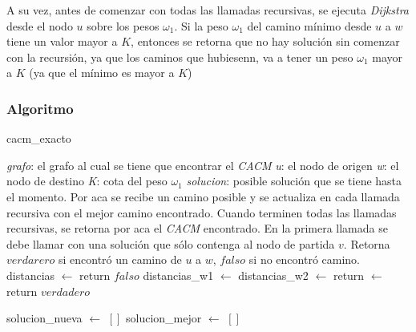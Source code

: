 A su vez, antes de comenzar con todas las llamadas recursivas, se ejecuta \emph{Dijkstra} desde el nodo $u$ sobre los pesos $\omega_1$. Si la peso $\omega_1$ del camino m\'inimo desde $u$ a $w$ tiene un valor mayor a $K$, entonces se retorna que no hay soluci\'on sin comenzar con la recursi\'on, ya que los caminos que hubiesenn, va a tener un peso $\omega_1$ mayor a $K$ (ya que el m\'inimo es mayor a $K$)

\subsubsection{Algoritmo}

\begin{algorithm}[!h]
\caption{cacm\_exacto} \label{exacto:pseudo}
\end{algorithm}
\begin{algorithmic}[1]
	\Require \emph{grafo}: el grafo al cual se tiene que encontrar el \emph{CACM}
	\Require \emph{u}: el nodo de origen
	\Require \emph{w}: el nodo de destino
	\Require \emph{K}: cota del peso $\omega_1$
	\Require \emph{solucion}: posible soluci\'on que se tiene hasta el momento. Por aca se recibe un camino posible y se actualiza en cada llamada recursiva con el mejor camino encontrado. Cuando terminen todas las llamadas recursivas, se retorna por aca el \emph{CACM} encontrado. En la primera llamada se debe llamar con una soluci\'on que s\'olo contenga al nodo de partida $v$.
	\Statex
	\Ensure Retorna $verdarero$ si encontr\'o un camino de $u$ a $w$, $falso$ si no encontr\'o camino.
	\Statex
		\State distancias $\gets$ 
			\State return $falso$
		\Else
			\State distancias\_w1 $\gets$ 
			\State distancias\_w2 $\gets$ 
			\State return $\gets$ 
		\EndIf
	\EndProcedure
	\Statex
			\State return $verdadero$
		\EndIf
		
		\State solucion\_nueva $\gets$ $[]$
		\State solucion\_mejor $\gets$ $[]$


\end{algorithmic}
